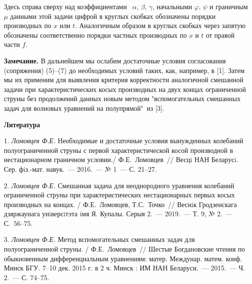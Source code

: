  Здесь справа сверху над коэффициентами ~$\alpha,\, \beta,\, \gamma$, начальными $\varphi,\,\psi$
и граничным $\mu$ данными этой задачи цифрой в круглых скобках
обозначены порядки производных по $x$ или $t.$ Аналогичным образом
в круглых скобках через запятую обозначены соответственно порядки
частных производных по $x$ и $t$ от правой части $f.$

{\bf Замечание.} В дальнейшем мы ослабим достаточные условия
согласования (сопряжения) (5)--(7) до необходимых условий таких,
как, например, в [1]. Затем мы их применим для выявления критерия
корректности аналогичной смешанной задачи при характеристических
косых производных на двух концах ограниченной струны без
продолжений данных новым методом "вспомогательных смешанных задач
для волновых уравнений на полупрямой"\, из [3].

\smallskip \centerline{\bf Литература}\nopagebreak

1. \textit{Ломовцев Ф.Е.}  {Необходимые и достаточные условия
вынужденных колебаний полуограниченной струны с первой
характеристической косой производной в нестационарном граничном
условии./ Ф.Е.~Ломовцев~// Весцi НАН Беларусi. Сер. фiз.-мат.
навук.~--- 2016.~--- № 1~--- С. 21--27.}


2. \textit{Ломовцев Ф.Е.} {Смешанная задача для неоднородного
уравнения колебаний ограниченной струны при характеристических
нестационарных первых косых производных на концах. /
Ф.Е.~Ломовцев, Т.С.~Точко~// Веснiк Гродзенскага дзяржаунага
унiверсiтэта iмя Я. Купалы. Серыя 2.~--- 2019.~--- Т. 9, № 2.~---
С.~56--75.}


3. \textit{Ломовцев Ф.Е.} {Метод вспомогательных смешанных задач
для полуограниченной струны. / Ф.Е.~Ломовцев~// Шестые
Богдановские чтения по обыкновенным дифференциальным уравнениям:
матер. Междунар. матем. конф. Минск БГУ. 7--10 дек. 2015 г. в 2 ч.
Минск : ИМ НАН Беларуси.~--- 2015.~--- Ч. 2.~--- С. 74--75.}


